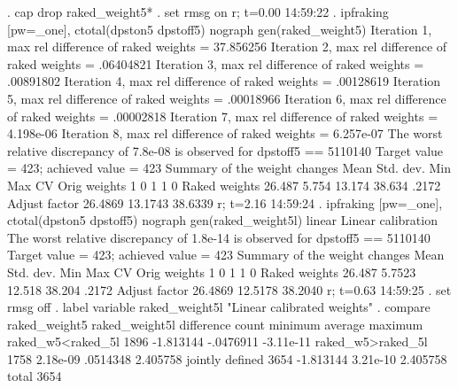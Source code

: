 . cap drop raked_weight5*
{\smallskip}
. set rmsg on
r; t=0.00 14:59:22
{\smallskip}
. ipfraking [pw=_one], ctotal(dpston5 dpstoff5) nograph gen(raked_weight5)
{\smallskip}
 Iteration 1, max rel difference of raked weights = 37.856256
 Iteration 2, max rel difference of raked weights = .06404821
 Iteration 3, max rel difference of raked weights = .00891802
 Iteration 4, max rel difference of raked weights = .00128619
 Iteration 5, max rel difference of raked weights = .00018966
 Iteration 6, max rel difference of raked weights = .00002818
 Iteration 7, max rel difference of raked weights = 4.198e-06
 Iteration 8, max rel difference of raked weights = 6.257e-07
The worst relative discrepancy of  7.8e-08 is observed for dpstoff5 == 5110140     
Target value =        423; achieved value =        423
{\smallskip}
   Summary of the weight changes
{\smallskip}
              {\VBAR}    Mean    Std. dev.    Min        Max       CV
Orig weights  {\VBAR}        1          0         1           1       0
Raked weights {\VBAR}   26.487      5.754    13.174      38.634   .2172
Adjust factor {\VBAR}  26.4869              13.1743     38.6339
r; t=2.16 14:59:24
{\smallskip}
. ipfraking [pw=_one], ctotal(dpston5 dpstoff5) nograph gen(raked_weight5l) linear
{\smallskip}
Linear calibration
The worst relative discrepancy of  1.8e-14 is observed for dpstoff5 == 5110140     
Target value =        423; achieved value =        423
{\smallskip}
   Summary of the weight changes
{\smallskip}
              {\VBAR}    Mean    Std. dev.    Min        Max       CV
Orig weights  {\VBAR}        1          0         1           1       0
Raked weights {\VBAR}   26.487     5.7523    12.518      38.204   .2172
Adjust factor {\VBAR}  26.4869              12.5178     38.2040
r; t=0.63 14:59:25
{\smallskip}
. set rmsg off
{\smallskip}
. label variable raked_weight5l "Linear calibrated weights"
{\smallskip}
. compare raked_weight5 raked_weight5l
{\smallskip}
                                         difference 
                            count       minimum      average     maximum
raked_w{\tytilde}5<raked_{\tytilde}5l          1896     -1.813144    -.0476911   -3.11e-11
raked_w{\tytilde}5>raked_{\tytilde}5l          1758      2.18e-09     .0514348    2.405758
jointly defined              3654     -1.813144     3.21e-10    2.405758
total                        3654
{\smallskip}
